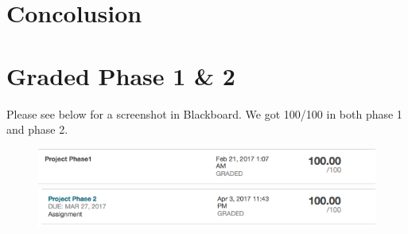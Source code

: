 \documentclass[12pt]{article}
\begin{document}
% 

\section{Concolusion}
    \label{sec:concolusion}
    

\section{Graded Phase 1 \& 2 }

Please see below for a screenshot in Blackboard. We got 100/100 in both phase 1 and phase 2.

\begin{figure}[h]
\centering 
\includegraphics[width=.75\columnwidth]{plots/phase1.png} 
\includegraphics[width=.75\columnwidth]{plots/phase2.png} 
\end{figure}



\end{document}
